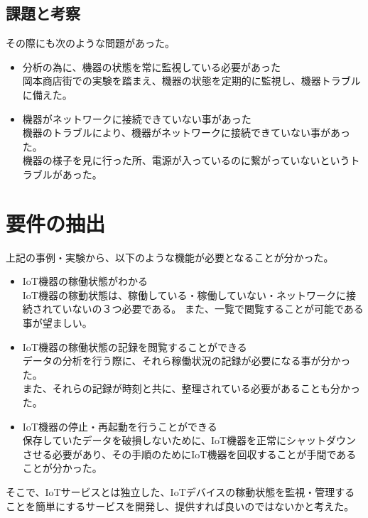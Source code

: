 \subsection{課題と考察}
その際にも次のような問題があった。
\begin{itemize}
	\item 分析の為に、機器の状態を常に監視している必要があった\\
		岡本商店街での実験を踏まえ、機器の状態を定期的に監視し、機器トラブルに備えた。
	\item 機器がネットワークに接続できていない事があった\\
		機器のトラブルにより、機器がネットワークに接続できていない事があった。\\
		機器の様子を見に行った所、電源が入っているのに繋がっていないというトラブルがあった。
\end{itemize}

\section{要件の抽出}
上記の事例・実験から、以下のような機能が必要となることが分かった。

\begin{itemize}
\item IoT機器の稼働状態がわかる\\
	IoT機器の稼動状態は、稼働している・稼働していない・ネットワークに接続されていないの３つ必要である。
	また、一覧で閲覧することが可能である事が望ましい。
\item IoT機器の稼働状態の記録を閲覧することができる\\
	データの分析を行う際に、それら稼働状況の記録が必要になる事が分かった。\\
	また、それらの記録が時刻と共に、整理されている必要があることも分かった。
\item IoT機器の停止・再起動を行うことができる\\
	保存していたデータを破損しないために、IoT機器を正常にシャットダウンさせる必要があり、その手順のためにIoT機器を回収することが手間であることが分かった。
\end{itemize}

そこで、IoTサービスとは独立した、IoTデバイスの稼動状態を監視・管理することを簡単にするサービスを開発し、提供すれば良いのではないかと考えた。





